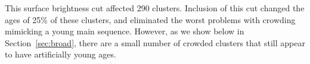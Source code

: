 \documentclass{emulateapj}
\begin{document}



This surface brightness cut affected 290 clusters.  Inclusion of this cut changed the ages of 25\% of these clusters, and eliminated the worst problems with crowding mimicking a young main sequence.  However, as we show below in Section~\ref{sec:broad}, there are a small number of crowded clusters that still appear to have artificially young ages.
\end{document}
